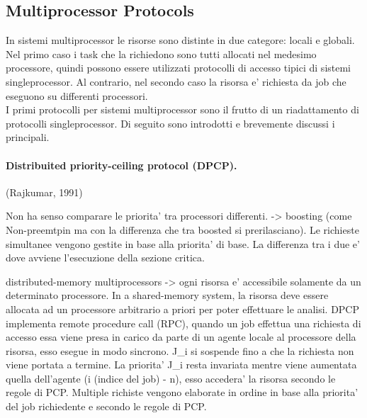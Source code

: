 \subsection{Multiprocessor Protocols}
\label{sec:lockProtocols.multi}

In sistemi multiprocessor le risorse sono distinte in due categore: locali e globali. Nel primo caso i task che la richiedono sono tutti allocati nel medesimo processore, quindi possono essere utilizzati protocolli di accesso tipici di sistemi singleprocessor. Al contrario, nel secondo caso la risorsa e' richiesta da job che eseguono su differenti processori.\\

I primi protocolli per sistemi multiprocessor sono il frutto di un riadattamento di protocolli singleprocessor. Di seguito sono introdotti e brevemente discussi i principali.

\paragraph{Distribuited priority-ceiling protocol (DPCP).} (Rajkumar, 1991) 



Non ha senso comparare le priorita' tra processori differenti. -> boosting (come Non-preemtpin ma con la differenza che tra boosted si prerilasciano).
Le richieste simultanee vengono gestite in base alla priorita' di base. La differenza tra i due e' dove avviene l'esecuzione della sezione critica.

distributed-memory multiprocessors -> ogni risorsa e' accessibile solamente da un determinato processore.
In a shared-memory system, la risorsa deve essere allocata ad un processore arbitrario a priori per poter effettuare le analisi.
DPCP implementa remote procedure call (RPC), quando un job effettua una richiesta di accesso essa viene presa in carico da parte di un agente locale al processore della risorsa, esso esegue in modo sincrono. J_i si sospende fino a che la richiesta non viene portata a termine. La priorita' J_i resta invariata mentre viene aumentata quella dell'agente (i (indice del job) - n), esso accedera' la risorsa secondo le regole di PCP. Multiple richiste vengono elaborate in ordine in base alla priorita' del job richiedente e secondo le regole di PCP.

